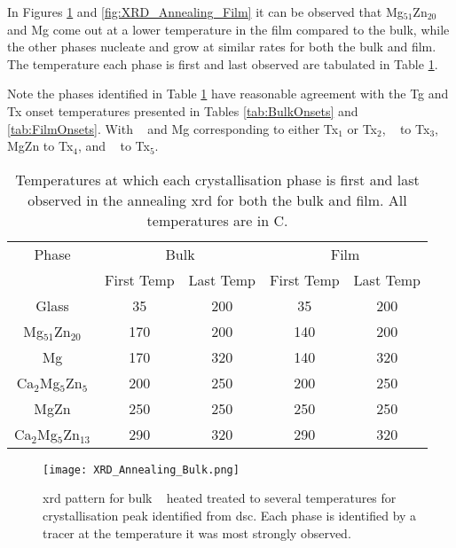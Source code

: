 \documentclass[a4paper,12pt,oneside]{article}%
\begin{document}
In Figures \ref{fig:XRD_Annealing_Bulk} and \ref{fig:XRD_Annealing_Film} it can be observed that Mg$_{51}$Zn$_{20}$ and Mg come out at a lower temperature in the film compared to the bulk, while the other phases nucleate and grow at similar rates for both the bulk and film. The temperature each phase is first and last observed are tabulated in Table \ref{tab:Crystal_Sequence}. 

Note the phases identified in Table \ref{tab:Crystal_Sequence} have reasonable agreement with the \gls{Tg} and \gls{Tx} onset temperatures presented in Tables \ref{tab:BulkOnsets} and \ref{tab:FilmOnsets}. With \MgZn~ and Mg corresponding to either \gls{Tx}$_{1}$ or \gls{Tx}$_{2}$, \CaMgZnFive~ to \gls{Tx}$_{3}$, MgZn to \gls{Tx}$_{4}$, and \CaMgZnThirteen~ to \gls{Tx}$_{5}$.

\begin{table}[h]
	\centering
	\caption{Temperatures at which each crystallisation phase is first and last observed in the annealing \acrshort{xrd} for both the bulk and film. All temperatures are in \degree C.}
	\begin{tabular}{ c c c c c }
		\toprule
		Phase & \multicolumn{2}{c}{Bulk} & \multicolumn{2}{c}{Film}                 \\
		& First Temp & Last Temp & First Temp & Last Temp \\
		\midrule
		Glass 						& 35 & 200 & 35 & 200 \\
		Mg$_{51}$Zn$_{20}$ \cite{Zhang2013, Khan1989} & 170 & 200 & 140 & 200 \\
		Mg 							& 170 & 320 & 140 & 320 \\
		Ca$_{2}$Mg$_{5}$Zn$_{5}$ \cite{Zhang2013, Cao2016} & 200 & 250 & 200 & 250 \\
		MgZn \cite{Khan1989} & 250 & 250 & 250 & 250 \\
		Ca$_{2}$Mg$_{5}$Zn$_{13}$ \cite{Zhang2013, Zhang2012, Zhang2011} & 290 & 320 & 290 & 320 \\
		\bottomrule
	\end{tabular}
	\label{tab:Crystal_Sequence}
\end{table}

\begin{figure}[b]
	\centering
	\texttt{[image: XRD\_Annealing\_Bulk.png]}
	\caption[Table of contents Capition]{\acrshort{xrd} pattern for bulk \MgZnCa~ heated treated to several temperatures for crystallisation peak identified from \acrshort{dsc}. Each phase is identified by a tracer at the temperature it was most strongly observed.}
	\label{fig:XRD_Annealing_Bulk}
\end{figure}
\end{document}
